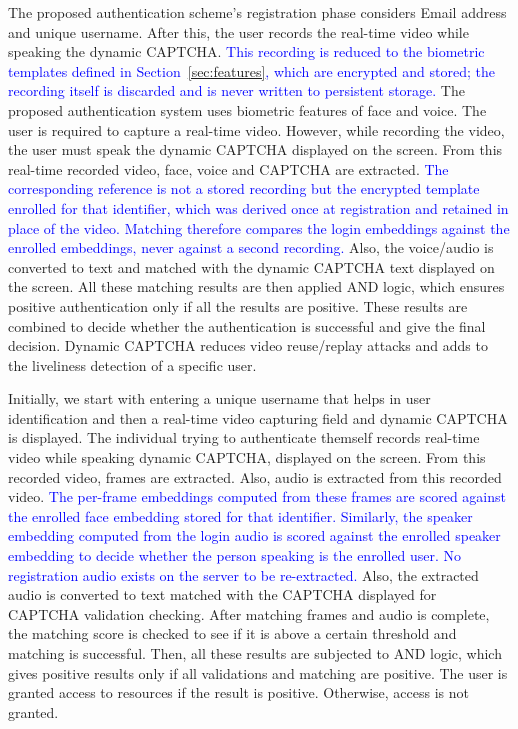 \documentclass[10pt,journal,compsoc]{IEEEtran}
\begin{document}
The proposed authentication scheme's registration phase considers Email address and unique username. After this, the user records the real-time video while speaking the dynamic CAPTCHA. \textcolor{blue}{This recording is reduced to the biometric templates defined in Section~\ref{sec:features}, which are encrypted and stored; the recording itself is discarded and is never written to persistent storage.}
The proposed authentication system uses biometric features of face and voice. The user is required to capture a real-time video. However, while recording the video, the user must speak the dynamic CAPTCHA displayed on the screen. From this real-time recorded video, face, voice and CAPTCHA are extracted. \textcolor{blue}{The corresponding reference is not a stored recording but the encrypted template enrolled for that identifier, which was derived once at registration and retained in place of the video. Matching therefore compares the login embeddings against the enrolled embeddings, never against a second recording.} Also, the voice/audio is converted to text and matched with the dynamic CAPTCHA text displayed on the screen. All these matching results are then applied AND logic, which ensures positive authentication only if all the results are positive. These results are combined to decide whether the authentication is successful and give the final decision. Dynamic CAPTCHA reduces video reuse/replay attacks and adds to the liveliness detection of a specific user.

 Initially, we start with entering a unique username that helps in user identification and then a real-time video capturing field and dynamic CAPTCHA is displayed. The individual trying to authenticate themself records real-time video while speaking dynamic CAPTCHA, displayed on the screen. From this recorded video, frames are extracted. Also, audio is extracted from this recorded video. \textcolor{blue}{The per-frame embeddings computed from these frames are scored against the enrolled face embedding stored for that identifier.}
\textcolor{blue}{Similarly, the speaker embedding computed from the login audio is scored against the enrolled speaker embedding to decide whether the person speaking is the enrolled user. No registration audio exists on the server to be re-extracted.} Also, the extracted audio is converted to text matched with the CAPTCHA displayed for CAPTCHA validation checking. After matching frames and audio is complete, the matching score is checked to see if it is above a certain threshold and matching is successful. Then, all these results are subjected to AND logic, which gives positive results only if all validations and matching are positive. The user is granted access to resources if the result is positive. Otherwise, access is not granted.
\end{document}
